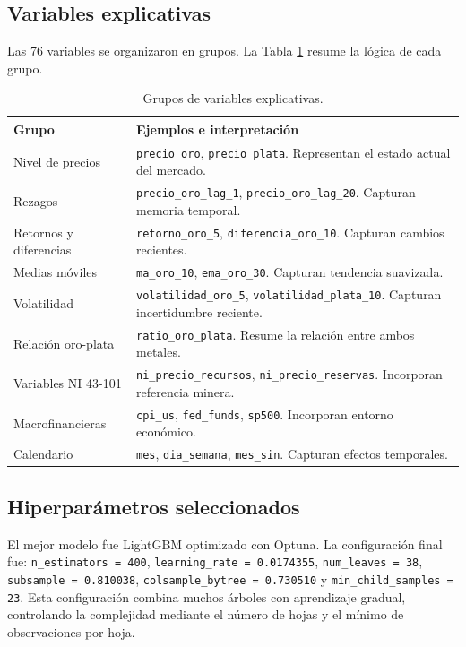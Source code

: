 \documentclass[12pt,letterpaper]{article}
\begin{document}
\subsection{Variables explicativas}
Las 76 variables se organizaron en grupos. La Tabla \ref{tab:variables_grupo} resume la lógica de cada grupo.

\begin{table}[H]
\centering
\caption{Grupos de variables explicativas.}
\label{tab:variables_grupo}
\begin{tabular}{lp{9cm}}
\toprule
Grupo & Ejemplos e interpretación \\
\midrule
Nivel de precios & \texttt{precio\_oro}, \texttt{precio\_plata}. Representan el estado actual del mercado. \\
Rezagos & \texttt{precio\_oro\_lag\_1}, \texttt{precio\_oro\_lag\_20}. Capturan memoria temporal. \\
Retornos y diferencias & \texttt{retorno\_oro\_5}, \texttt{diferencia\_oro\_10}. Capturan cambios recientes. \\
Medias móviles & \texttt{ma\_oro\_10}, \texttt{ema\_oro\_30}. Capturan tendencia suavizada. \\
Volatilidad & \texttt{volatilidad\_oro\_5}, \texttt{volatilidad\_plata\_10}. Capturan incertidumbre reciente. \\
Relación oro-plata & \texttt{ratio\_oro\_plata}. Resume la relación entre ambos metales. \\
Variables NI 43-101 & \texttt{ni\_precio\_recursos}, \texttt{ni\_precio\_reservas}. Incorporan referencia minera. \\
Macrofinancieras & \texttt{cpi\_us}, \texttt{fed\_funds}, \texttt{sp500}. Incorporan entorno económico. \\
Calendario & \texttt{mes}, \texttt{dia\_semana}, \texttt{mes\_sin}. Capturan efectos temporales. \\
\bottomrule
\end{tabular}
\end{table}

\subsection{Hiperparámetros seleccionados}
El mejor modelo fue LightGBM optimizado con Optuna. La configuración final fue: \texttt{n\_estimators = 400}, \texttt{learning\_rate = 0.0174355}, \texttt{num\_leaves = 38}, \texttt{subsample = 0.810038}, \texttt{colsample\_bytree = 0.730510} y \texttt{min\_child\_samples = 23}. Esta configuración combina muchos árboles con aprendizaje gradual, controlando la complejidad mediante el número de hojas y el mínimo de observaciones por hoja.
\end{document}
